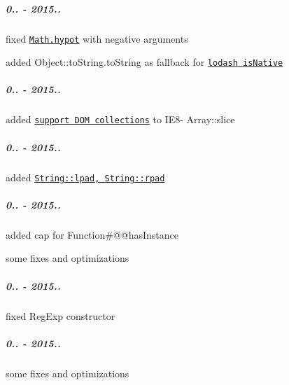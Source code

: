 \subparagraph*{0.. -\/ 2015..}


\begin{DoxyItemize}
\item fixed \href{https://github.com/zloirock/core-js/#ecmascript-6-math}{\tt {\ttfamily Math.\+hypot}} with negative arguments
\item added {\ttfamily Object\+::to\+String.\+to\+String} as fallback for \href{https://github.com/lodash/lodash/issues/1197}{\tt {\ttfamily lodash} {\ttfamily is\+Native}}
\end{DoxyItemize}

\subparagraph*{0.. -\/ 2015..}


\begin{DoxyItemize}
\item added \href{https://developer.mozilla.org/en-US/docs/Web/JavaScript/Reference/Global_Objects/Array/slice#Streamlining_cross-browser_behavior}{\tt support D\+OM collections} to I\+E8-\/ {\ttfamily Array\+::slice}
\end{DoxyItemize}

\subparagraph*{0.. -\/ 2015..}


\begin{DoxyItemize}
\item added \href{https://github.com/zloirock/core-js/#ecmascript-7-proposals}{\tt {\ttfamily String\+::lpad}, {\ttfamily String\+::rpad}}
\end{DoxyItemize}

\subparagraph*{0.. -\/ 2015..}


\begin{DoxyItemize}
\item added cap for {\ttfamily Function\#@@has\+Instance}
\item some fixes and optimizations
\end{DoxyItemize}

\subparagraph*{0.. -\/ 2015..}


\begin{DoxyItemize}
\item fixed {\ttfamily Reg\+Exp} constructor
\end{DoxyItemize}

\subparagraph*{0.. -\/ 2015..}


\begin{DoxyItemize}
\item some fixes and optimizations
\end{DoxyItemize}

